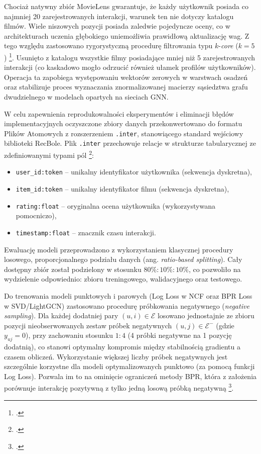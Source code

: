 Chociaż natywny zbiór MovieLens gwarantuje, że każdy użytkownik posiada co najmniej 20 zarejestrowanych interakcji, warunek ten nie dotyczy katalogu filmów. Wiele niszowych pozycji posiada zaledwie pojedyncze oceny, co w architekturach uczenia głębokiego uniemożliwia prawidłową aktualizację wag. Z tego względu zastosowano rygorystyczną procedurę filtrowania typu $k$-\foreignlanguage{english}{\textit{core}} ($k = 5$) \footcite{heNeuralCollaborativeFilteringKwiecien032017}. Usunięto z katalogu wszystkie filmy posiadające mniej niż 5 zarejestrowanych interakcji (co kaskadowo mogło odrzucić również ułamek profilów użytkowników). Operacja ta zapobiega występowaniu wektorów zerowych w warstwach osadzeń oraz stabilizuje proces wyznaczania znormalizowanej macierzy sąsiedztwa grafu dwudzielnego w modelach opartych na sieciach GNN.

W celu zapewnienia reprodukowalności eksperymentów i eliminacji błędów implementacyjnych oczyszczone zbiory danych przekonwertowano do formatu Plików Atomowych z rozszerzeniem \texttt{.inter}, stanowiącego standard wejściowy biblioteki RecBole. Plik \texttt{.inter} przechowuje relacje w strukturze tabularycznej ze zdefiniowanymi typami pól \footcite[]{zhaoRecBoleUnifiedComprehensive2020}:
\begin{itemize}
    \item \texttt{user\_id:token} -- unikalny identyfikator użytkownika (sekwencja dyskretna),
    \item \texttt{item\_id:token} -- unikalny identyfikator filmu (sekwencja dyskretna),
    \item \texttt{rating:float} -- oryginalna ocena użytkownika (wykorzystywana pomocniczo),
    \item \texttt{timestamp:float} -- znacznik czasu interakcji.
\end{itemize}


Ewaluację modeli przeprowadzono z wykorzystaniem klasycznej procedury losowego, proporcjonalnego podziału danych (ang. \foreignlanguage{english}{\textit{ratio-based splitting}}). Cały dostępny zbiór został podzielony w stosunku $80\% : 10\% : 10\%$, co pozwoliło na wydzielenie odpowiednio: zbioru treningowego, walidacyjnego oraz testowego.

Do trenowania modeli punktowych i parowych (Log Loss w NCF oraz BPR Loss w SVD/LightGCN) zastosowano procedurę próbkowania negatywnego (\foreignlanguage{english}{\textit{negative sampling}}). Dla każdej dodatniej pary $(u, i) \in \mathcal{E}$ losowano jednostajnie ze zbioru pozycji nieobserwowanych zestaw próbek negatywnych $(u, j) \in \mathcal{E}^-$ (gdzie $y_{uj} = 0$), przy zachowaniu stosunku $1:4$ (4 próbki negatywne na 1 pozycję dodatnią), co stanowi optymalny kompromis między stabilnością gradientu a czasem obliczeń. Wykorzystanie większej liczby próbek negatywnych jest szczególnie korzystne dla modeli optymalizowanych punktowo (za pomocą funkcji Log Loss). Pozwala im to na ominięcie ograniczeń metody BPR, która z założenia porównuje interakcję pozytywną z tylko jedną losową próbką negatywną \footcite{heNeuralCollaborativeFilteringKwiecien032017}.

